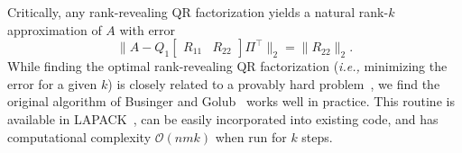 Critically, any rank-revealing QR factorization yields a natural rank-$k$ approximation of $A$ with error
\begin{equation*}
    \| A - Q_1 
    \begin{bmatrix}
    R_{11} & R_{22}
    \end{bmatrix}
    \Pi^\top \|_2
    =
    \| R_{22} \|_2.
\end{equation*}
While finding the optimal rank-revealing QR factorization (\emph{i.e.,} minimizing the error for a given $k$) is closely related to a provably hard problem~\cite{civril2009selecting}, we find the original algorithm of Businger and Golub~\cite{businger1965linear} works well in practice. This routine is available in LAPACK~\cite{lapack,blas3QRCP}, can be easily incorporated into existing code, and has computational complexity $\mathcal{O}(nmk)$ when run for $k$ steps.  



